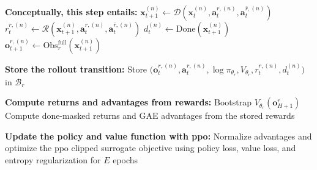 \begin{algorithm}[H]
\begin{algorithmic}[1]
    \State \textbf{Conceptually, this step entails:}
    \State \hspace{2em} $\mathbf{x}_{t+1}^{(n)} \leftarrow \mathcal{D}\!\left(\mathbf{x}_t^{(n)}, \mathbf{a}_t^{r,(n)}, \mathbf{a}_t^{\bar r,(n)}\right)$
    \State \hspace{2em} $r_t^{r,(n)} \leftarrow \mathcal{R}\!\left(\mathbf{x}_{t+1}^{(n)}, \mathbf{a}_t^{r,(n)}, \mathbf{a}_t^{\bar r,(n)}\right)$
    \State \hspace{2em} $d_t^{(n)} \leftarrow \mathrm{Done}\!\left(\mathbf{x}_{t+1}^{(n)}\right)$
    \State \hspace{2em} $\mathbf{o}_{t+1}^{r,(n)} \leftarrow \mathrm{Obs}^{\mathrm{full}}_r(\mathbf{x}_{t+1}^{(n)})$

    \State \textbf{Store the rollout transition:}
    \State \hspace{1em} Store $\big(\mathbf{o}_t^{r,(n)}, \mathbf{a}_t^{r,(n)}, \log \pi_{\theta_r}, V_{\theta_r}, r_t^{r,(n)}, d_t^{(n)}\big)$ in $\mathcal{B}_r$
  \EndFor

  \State \textbf{Compute returns and advantages from rewards:}
  \State \hspace{1em} Bootstrap $V_{\theta_r}(\mathbf{o}_{H+1}^r)$
  \State \hspace{1em} Compute done-masked returns and GAE advantages from the stored rewards

  \State \textbf{Update the policy and value function with \acs{ppo}:}
  \State \hspace{1em} Normalize advantages and optimize the \acs{ppo} clipped surrogate objective
  \State \hspace{1em} using policy loss, value loss, and entropy regularization for $E$ epochs
\EndFor
\end{algorithmic}
\end{algorithm}

